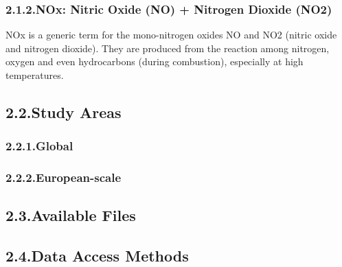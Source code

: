 \documentclass[9pt]{report}
\begin{document}
\subsubsection{2.1.2.\hspace*{0.5em}NOx: Nitric Oxide (NO) + Nitrogen Dioxide (NO2)}\label{sec-nosubxsub--nitric-oxide-no-nitrogen-dioxide-nosub2sub}%

\noindent{}NOx is a generic term for the mono-nitrogen oxides NO and NO2 (nitric oxide and nitrogen dioxide).
They are produced from the reaction among nitrogen, oxygen and even hydrocarbons (during combustion), especially at high temperatures.%

\subsection{2.2.\hspace*{0.5em}Study Areas}\label{sec-study-areas}%

\subsubsection{2.2.1.\hspace*{0.5em}Global}\label{sec-global}%

\subsubsection{2.2.2.\hspace*{0.5em}European-scale}\label{sec-european-scale}%

\subsection{2.3.\hspace*{0.5em}Available Files}\label{sec-available-files}%

\subsection{2.4.\hspace*{0.5em}Data Access Methods}\label{sec-data-access-methods}%
\end{document}
